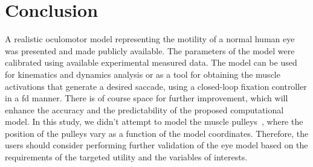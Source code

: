 \documentclass[11pt,a4paper,draft=false]{report}
\begin{document}

\section*{Conclusion}\label{sec:concluison}

A realistic oculomotor model representing the motility of a normal human eye was
presented and made publicly available. The parameters of the model were
calibrated using available experimental measured data. The model can be used for
kinematics and dynamics analysis or as a tool for obtaining the muscle
activations that generate a desired saccade, using a closed-loop fixation
controller in a \gls{fd} manner. There is of course space for further
improvement, which will enhance the accuracy and the predictability of the
proposed computational model. In this study, we didn't attempt to model the
muscle pulleys~\cite{Kono2002a}, where the position of the pulleys vary as a
function of the model coordinates. Therefore, the users should consider
performing further validation of the eye model based on the requirements of the
targeted utility and the variables of interests.




\end{document}

